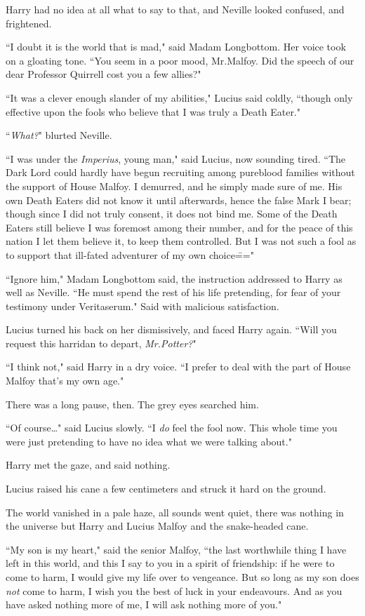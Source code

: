 Harry had no idea at all what to say to that, and Neville looked confused, and frightened.

``I doubt it is the world that is mad," said Madam Longbottom. Her voice took on a gloating tone. ``You seem in a poor mood, Mr.\?Malfoy. Did the speech of our dear Professor Quirrell cost you a few allies?"

``It was a clever enough slander of my abilities," Lucius said coldly, ``though only effective upon the fools who believe that I was truly a Death Eater."

``\emph{What?}" blurted Neville.

``I was under the \emph{Imperius}, young man," said Lucius, now sounding tired. ``The Dark Lord could hardly have begun recruiting among pureblood families without the support of House Malfoy. I demurred, and he simply made sure of me. His own Death Eaters did not know it until afterwards, hence the false Mark I bear; though since I did not truly consent, it does not bind me. Some of the Death Eaters still believe I was foremost among their number, and for the peace of this nation I let them believe it, to keep them controlled. But I was not such a fool as to support that ill-fated adventurer of my own choice\==="

``Ignore him," Madam Longbottom said, the instruction addressed to Harry as well as Neville. ``He must spend the rest of his life pretending, for fear of your testimony under Veritaserum." Said with malicious satisfaction.

Lucius turned his back on her dismissively, and faced Harry again. ``Will you request this harridan to depart, \emph{Mr.\?Potter?}"

``I think not," said Harry in a dry voice. ``I prefer to deal with the part of House Malfoy that's my own age."

There was a long pause, then. The grey eyes searched him.

``Of course{\ldots}" said Lucius slowly. ``I \emph{do} feel the fool now. This whole time you were just pretending to have no idea what we were talking about."

Harry met the gaze, and said nothing.

Lucius raised his cane a few centimeters and struck it hard on the ground.

The world vanished in a pale haze, all sounds went quiet, there was nothing in the universe but Harry and Lucius Malfoy and the snake-headed cane.

``My son is my heart," said the senior Malfoy, ``the last worthwhile thing I have left in this world, and this I say to you in a spirit of friendship: if he were to come to harm, I would give my life over to vengeance. But so long as my son does \emph{not} come to harm, I wish you the best of luck in your endeavours. And as you have asked nothing more of me, I will ask nothing more of you."

